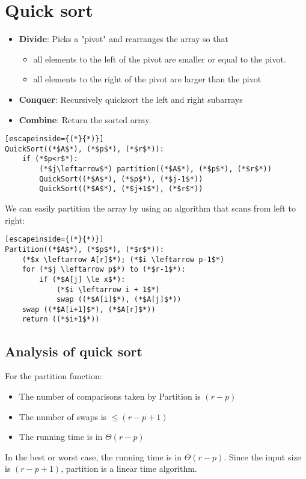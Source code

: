 \documentclass[a4paper]{article}
\begin{document}
\section{Quick sort}
\begin{itemize}
	\item[] \textbf{Divide}: Picks a "pivot" and rearranges the array so that
	\begin{itemize}
		\item all elements to the left of the pivot are smaller or equal to the pivot.
		\item all elements to the right of the pivot are larger than the pivot
	\end{itemize}
	\item[] \textbf{Conquer}: Recursively quicksort the left and right subarrays
	\item[] \textbf{Combine}: Return the sorted array.
\end{itemize}
\begin{lstlisting}[escapeinside={(*}{*)}]
QuickSort((*$A$*), (*$p$*), (*$r$*)):
	if (*$p<r$*):
		(*$j\leftarrow$*) partition((*$A$*), (*$p$*), (*$r$*))
		QuickSort((*$A$*), (*$p$*), (*$j-1$*))
		QuickSort((*$A$*), (*$j+1$*), (*$r$*))
\end{lstlisting}
We can easily partition the array by using an algorithm that scans from left to right:
\begin{lstlisting}[escapeinside={(*}{*)}]
Partition((*$A$*), (*$p$*), (*$r$*)):
	(*$x \leftarrow A[r]$*); (*$i \leftarrow p-1$*)
	for (*$j \leftarrow p$*) to (*$r-1$*):
		if (*$A[j] \le x$*):
			(*$i \leftarrow i + 1$*)
			swap ((*$A[i]$*), (*$A[j]$*))
	swap ((*$A[i+1]$*), (*$A[r]$*))
	return ((*$i+1$*))
\end{lstlisting}
\subsection{Analysis of quick sort}
For the partition function:
\begin{itemize}
	\item The number of comparisons taken by Partition is $(r-p)$
	\item The number of swaps is $\le (r-p+1)$
	\item The running time is in $\Theta(r-p)$
\end{itemize}
In the best or worst case, the running time is in $\Theta(r-p)$. Since the input size is $(r-p+1)$, partition is a linear time algorithm.
\end{document}
